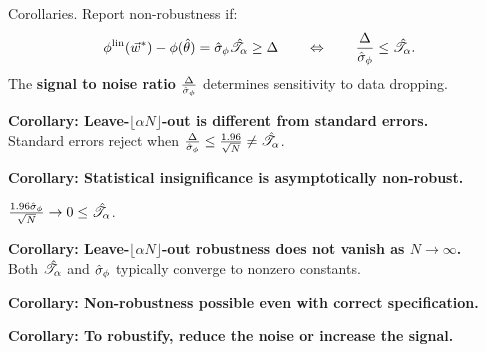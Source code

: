 \begin{frame}[t]{Corollaries.}
%
Report non-robustness if:
%
\begin{align*}
%
\thetafunlin(\w^*) - \thetafun(\thetahat)  = \noise \shape \ge \Delta
\quad\quad
\Leftrightarrow
\quad\quad
\frac{\Delta}{\noise} \le \shape.
%
\end{align*}
%
The \textbf{signal to noise ratio} $\frac{\Delta}{\hat\sigma_{\phi}}$
determines sensitivity to data dropping.


\hrulefill


\pause
\vspace{0.5em}
\textbf{Corollary:  Leave-$\lfloor \alpha N \rfloor$-out is different from standard errors.}\\
Standard errors reject when
$\frac{\Delta}{\hat\sigma_{\phi}} \le \frac{1.96}{\sqrt{N}} \ne \hat{\mathscr{T}}_\alpha$.

\pause
\vspace{0.5em}
\textbf{Corollary:  Statistical insignificance is asymptotically non-robust.}

$\frac{1.96 \hat \sigma_\phi}{\sqrt{N}} \rightarrow 0 \le \hat{\mathscr{T}}_\alpha$.

\pause
\vspace{0.5em}
\textbf{Corollary:  Leave-$\lfloor \alpha N \rfloor$-out robustness does not vanish as $N \rightarrow \infty$.}\\
%
Both $\hat{\mathscr{T}}_\alpha$ and $\hat\sigma_{\phi}$ typically converge to nonzero constants.

\pause
\vspace{0.5em}
\textbf{Corollary:  Non-robustness possible even with correct specification.}
%

\pause
\vspace{0.5em}
\textbf{Corollary:  To robustify, reduce the noise or increase
the signal.}

\end{frame}
